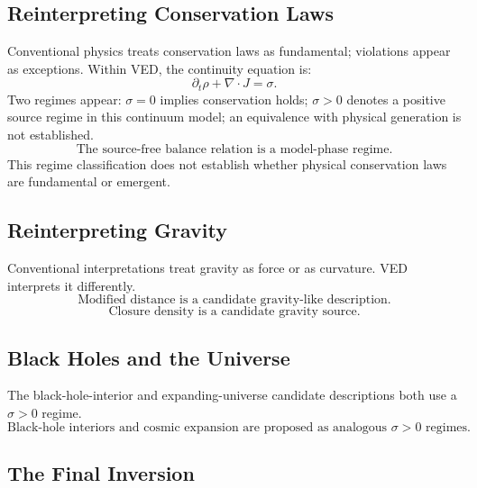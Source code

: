 \subsection{Reinterpreting Conservation Laws}

Conventional physics treats conservation laws as fundamental;
violations appear as exceptions.
Within VED, the continuity equation is:
\begin{equation}
  \partial_t \rho + \nabla \cdot J = \sigma.
\end{equation}
Two regimes appear:
$\sigma = 0$ implies conservation holds;
$\sigma>0$ denotes a positive source regime in this continuum model; an
equivalence with physical generation is not established.
\begin{equation}
  \boxed{\text{The source-free balance relation is a model-phase regime.}}
\end{equation}
This regime classification does not establish whether physical conservation
laws are fundamental or emergent.

\subsection{Reinterpreting Gravity}

Conventional interpretations treat gravity as force or as curvature.
VED interprets it differently.
\begin{equation}
  \boxed{\text{Modified distance is a candidate gravity-like description.}}
\end{equation}
\begin{equation}
  \boxed{\text{Closure density is a candidate gravity source.}}
\end{equation}

\subsection{Black Holes and the Universe}

The black-hole-interior and expanding-universe candidate descriptions both
use a $\sigma>0$ regime.
\begin{equation}
  \boxed{\text{Black-hole interiors and cosmic expansion are proposed as
  analogous } \sigma>0 \text{ regimes.}}
\end{equation}

\subsection{The Final Inversion}

